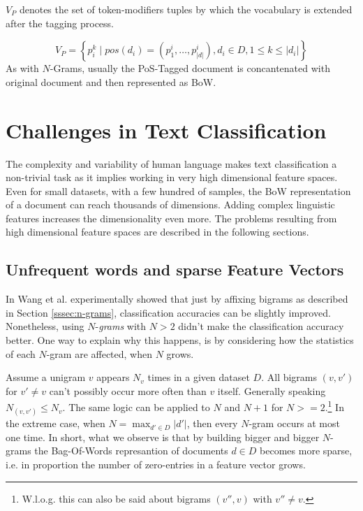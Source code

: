$V_P$ denotes the set of token-modifiers tuples by which
the vocabulary is extended after the tagging process.

\begin{equation*}
V_P = \left\{ p_i^k \mid pos(d_i) = (p_1^i,\ldots,p_{|d|}^i), d_i \in D, 1 \leq
k \leq |d_i| \right\}
\end{equation*}
As with $N$-Grams, usually
the PoS-Tagged document is concantenated with original document and then
represented as BoW.

\section{Challenges in Text Classification}

The complexity and variability of human language makes text
classification a non-trivial task as it implies working in very high
dimensional feature spaces. Even for small datasets, with a few hundred of
samples, the BoW representation of a document can reach thousands of dimensions.
Adding complex linguistic features increases the dimensionality even more. The
problems resulting from high dimensional feature spaces are described in the
following sections.

\subsection{Unfrequent words and sparse Feature Vectors}

In \cite{wang2012baselines} Wang et al. experimentally showed that just by
affixing bigrams as described in Section \ref{sssec:n-grams}, classification
accuracies can be slightly improved.
Nonetheless, using $N$-\textit{grams} with $N > 2$ didn't make the
classification accuracy better.
One way to explain why this happens, is by considering how the
statistics of each $N$-gram are affected, when $N$ grows.

Assume a unigram $v$ appears $N_v$ times in a given dataset $D$. All bigrams
$(v,v')$ for $v' \neq v$ can't possibly occur more often than  $v$ itself.
Generally speaking $N_{(v,v')} \leq N_v$.
The same logic can be applied to $N$ and $N+1$ for $N >= 2$.\footnote{W.l.o.g.
this can also be said about bigrams $(v'',v)$ with $v '' \neq v$.} In the
extreme case, when $N = \max_{d' \in D} |d'|$, then every $N$-gram occurs at most one time. In short,
what we observe is that by building bigger and bigger $N$-grams the
Bag-Of-Words represantion of documents $d \in D$ becomes more sparse, i.e. in
proportion the number of zero-entries in a feature vector grows.

